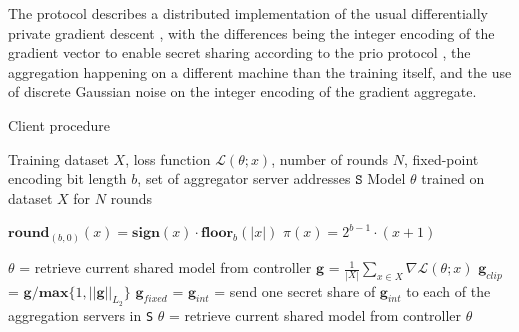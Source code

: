 \documentclass{article}
\begin{document}
The protocol describes a distributed implementation of the usual differentially private gradient descent \cite{Abadi_2016}, with the differences being the integer encoding of the gradient vector to enable secret sharing according to the prio protocol \cite{prio}, the aggregation happening on a different machine than the training itself, and the use of discrete Gaussian noise on the integer encoding of the gradient aggregate.
\begin{algorithm}[h]
  \caption{Client procedure}\label{alg:client}

  \begin{algorithmic}[1]
  \Require Training dataset $X$, loss function $\mathcal L(\theta; x)$, number of rounds $N$, fixed-point encoding bit length $b$, set of aggregator server addresses $\texttt{S}$
  \Ensure Model $\theta$ trained on dataset $X$ for $N$ rounds

  \State $\textbf{round}_{(b,0)}(x) = \textbf{sign}(x) \cdot \textbf{floor}_b(|x|)$ 
  \State $\pi(x) = 2^{b-1}\cdot (x + 1)$ 

  \label{lst:line:loop}
  \State$\theta$ = retrieve current shared model from controller\label{lst:line:retrieve}
  \State$\textbf{g}$ = $\frac{1}{|X|} \sum_{x\in X} \nabla\mathcal L(\theta; x)$ 
\label{lst:line:grad}
  \State$\textbf{g}_{clip}$ = $\textbf{g}/\mathbf{max}\{1,||\textbf{g}||_{L_2}\}$ \label{lst:line:clip}
  \State$\textbf{g}_{fixed}$ =  
  \State$\textbf{g}_{int}$ =  
\label{lst:line:project}
  \State send one secret share of $\textbf{g}_{int}$ to each of the aggregation servers in \texttt S
  \EndFor
  \State$\theta$ = retrieve current shared model from controller
  \State\Return $\theta$
  \end{algorithmic}
\end{algorithm}
\end{document}
